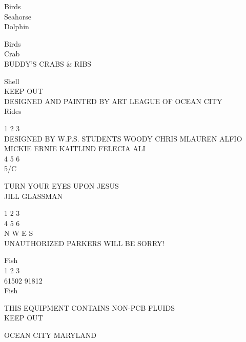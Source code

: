 \documentclass[10pt,letterpaper]{article}
\begin{document}
Birds\\
Seahorse\\
Dolphin

Birds\\
Crab\\
BUDDY'S CRABS \& RIBS

Shell\\
KEEP OUT\\
DESIGNED AND PAINTED BY ART LEAGUE OF OCEAN CITY\\
Rides

1 2 3\\
DESIGNED BY W.P.S. STUDENTS WOODY CHRIS MLAUREN ALFIO MICKIE ERNIE KAITLIND FELECIA ALI\\
4 5 6\\
5/C

TURN YOUR EYES UPON JESUS\\
JILL GLASSMAN

1 2 3\\
4 5 6\\
N W E S\\
UNAUTHORIZED PARKERS WILL BE SORRY!

Fish\\
1 2 3\\
61502 91812\\
Fish

THIS EQUIPMENT CONTAINS NON{-}PCB FLUIDS\\
KEEP OUT

OCEAN CITY MARYLAND
\
\end{document}
